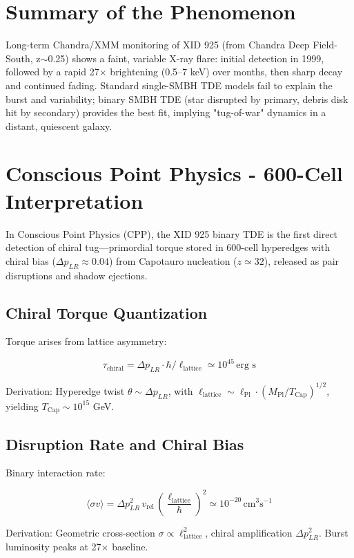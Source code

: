 \documentclass[11pt]{article}
\begin{document}
\section{Summary of the Phenomenon}
Long-term Chandra/XMM monitoring of XID 925 (from Chandra Deep Field-South, z$\sim$0.25) shows a faint, variable X-ray flare: initial detection in 1999, followed by a rapid 27$\times$ brightening (0.5--7 keV) over months, then sharp decay and continued fading. Standard single-SMBH TDE models fail to explain the burst and variability; binary SMBH TDE (star disrupted by primary, debris disk hit by secondary) provides the best fit, implying "tug-of-war" dynamics in a distant, quiescent galaxy.

\section{Conscious Point Physics - 600-Cell Interpretation}
In Conscious Point Physics (CPP), the XID 925 binary TDE is the first direct detection of chiral tug—primordial torque stored in 600-cell hyperedges with chiral bias ($\Delta p_{LR} \approx 0.04$) from Capotauro nucleation ($z \simeq 32$), released as pair disruptions and shadow ejections.

\subsection{Chiral Torque Quantization}
Torque arises from lattice asymmetry:

\[
\tau_{\text{chiral}} = \Delta p_{LR} \cdot \hbar / \ell_{\text{lattice}} \simeq 10^{45} \, \text{erg s}
\]

Derivation: Hyperedge twist $\theta \sim \Delta p_{LR}$, with $\ell_{\text{lattice}} \sim \ell_{\text{Pl}} \cdot (M_{\text{Pl}} / T_{\text{Cap}})^{1/2}$, yielding $T_{\text{Cap}} \sim 10^{15}$ GeV.

\subsection{Disruption Rate and Chiral Bias}
Binary interaction rate:

\[
\langle \sigma v \rangle = \Delta p_{LR}^2 \, v_{\text{rel}} \, \left( \frac{\ell_{\text{lattice}}}{\hbar} \right)^2 \simeq 10^{-20} \, \text{cm}^3 \text{s}^{-1}
\]

Derivation: Geometric cross-section $\sigma \propto \ell_{\text{lattice}}^2$, chiral amplification $\Delta p_{LR}^2$. Burst luminosity peaks at 27$\times$ baseline.
\end{document}
